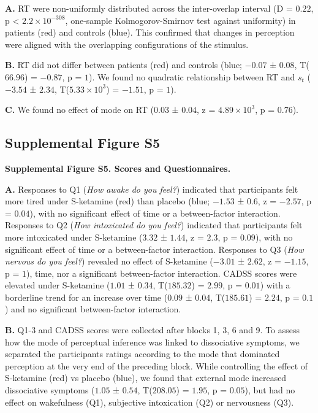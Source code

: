 \documentclass[
]{article}
\begin{document}
\textbf{A.} RT were non-uniformly distributed across the inter-overlap
interval (D = \(0.22\), p < \(\ensuremath{2.2\times 10^{-308}}\), one-sample Kolmogorov-Smirnov test
against uniformity) in patients (red) and controls (blue). This
confirmed that changes in perception were aligned with the overlapping
configurations of the stimulus.

\textbf{B.} RT did not differ between patients (red) and controls (blue;
\(-0.07\) ± \(0.08\), T(\(66.96\)) = \(-0.87\), p = \(1\)). We found no
quadratic relationship between RT and \(s_t\) (\(-3.54\) ± \(2.34\),
T(\(\ensuremath{5.33\times 10^{3}}\)) = \(-1.51\), p = \(1\)).

\textbf{C.} We found no effect of mode on RT (\(0.03\) ± \(0.04\), z =
\(\ensuremath{4.89\times 10^{3}}\), p = \(0.76\)).

\newpage

\hypertarget{supplemental-figure-s5}{%
\subsection{Supplemental Figure S5}\label{supplemental-figure-s5}}


\textbf{Supplemental Figure S5. Scores and Questionnaires.}

\textbf{A.} Responses to Q1 (\emph{How awake do you feel?}) indicated
that participants felt more tired under S-ketamine (red) than placebo
(blue; \(-1.53\) ± \(0.6\), z = \(-2.57\), p = \(0.04\)), with no
significant effect of time or a between-factor interaction. Responses to
Q2 (\emph{How intoxicated do you feel?}) indicated that participants
felt more intoxicated under S-ketamine (\(3.32\) ± \(1.44\), z =
\(2.3\), p = \(0.09\)), with no significant effect of time or a
between-factor interaction. Responses to Q3 (\emph{How nervous do you
feel?}) revealed no effect of S-ketamine (\(-3.01\) ± \(2.62\), z =
\(-1.15\), p = \(1\)), time, nor a significant between-factor
interaction. CADSS scores were elevated under S-ketamine (\(1.01\) ±
\(0.34\), T(\(185.32\)) = \(2.99\), p = \(0.01\)) with a borderline
trend for an increase over time (\(0.09\) ± \(0.04\), T(\(185.61\)) =
\(2.24\), p = \(0.1\)) and no significant between-factor interaction.

\textbf{B.} Q1-3 and CADSS scores were collected after blocks 1, 3, 6
and 9. To assess how the mode of perceptual inference was linked to
dissociative symptoms, we separated the participants ratings according
to the mode that dominated perception at the very end of the preceding
block. While controlling the effect of S-ketamine (red) vs placebo
(blue), we found that external mode increased dissociative symptoms
(\(1.05\) ± \(0.54\), T(\(208.05\)) = \(1.95\), p = \(0.05\)), but had
no effect on wakefulness (Q1), subjective intoxication (Q2) or
nervousness (Q3).
\end{document}
